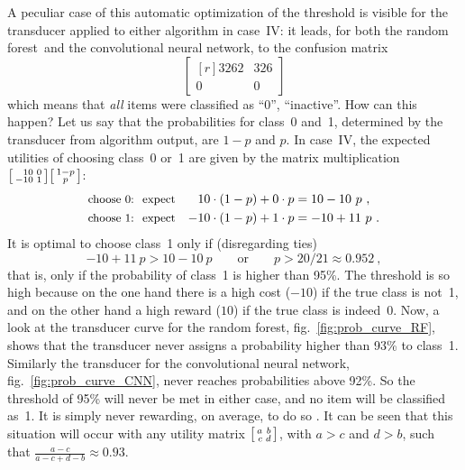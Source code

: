 \documentclass[a4paper,12pt,%
onecolumn,oneside,article,%
british%
]{memoir}
\newcommand*{\p}{\mathrm{p}}%
\renewcommand*{\|}[1][]{\nonscript\:#1\vert\nonscript\:\mathopen{}}
\newcommand*{\fig}{fig.}%
\newcommand*{\cf}{{cf.}}
\newcommand*{\texts}[1]{\text{\small #1}}
\newcommand*{\RF}{random forest}
\newcommand*{\CNN}{convolutional neural network}
\newcommand*{\umatrix}[4]{\begin{bmatrix*}[r]#1&#2\\#3&#4\end{bmatrix*}}
\newcommand*{\sumatrix}[4]{\begin{bsmallmatrix*}[r]#1&#2\\#3&#4\end{bsmallmatrix*}}
\begin{document}
A peculiar case of this automatic optimization of the threshold is visible for the transducer applied to either algorithm in case~IV: it leads, for both the \RF\ and the \CNN, to the confusion matrix
\begin{equation}
  \label{eq:peculiar_CM}
  \umatrix{3262}{326}{0}{0}
\end{equation}
which means that \emph{all} items were classified as \enquote{0}, \enquote{inactive}. How can this happen? Let us say that the probabilities for class~0 and~1, determined by the transducer from algorithm output, are $1-p$ and $p$. In case~IV, the expected utilities of choosing class~0 or~1 are given by the matrix multiplication $\sumatrix{10}{0}{-10}{1} \begin{bsmallmatrix}1-p\\p\end{bsmallmatrix}$:
\begin{equation}
  \label{eq:expe_utilities_peculiar}
  \begin{aligned}
    \texts{choose 0:\; expect}&& 10 \cdot (1-p) + 0 \cdot p &= 10 - 10\ p \ ,
                                                            \\
    \texts{choose 1:\; expect}&& -10 \cdot (1-p) + 1 \cdot p &= -10 + 11\ p \ .
  \end{aligned}
\end{equation}
It is optimal to choose class~1 only if (disregarding ties)
\begin{equation}
  \label{eq:when_choose_0}
  -10 + 11\ p > 10 - 10\ p
  \qquad\text{or}\qquad
  p > 20/21 \approx 0.952 \ ,
\end{equation}
that is, only if the probability of class~1 is higher than 95\%. The threshold is so high because on the one hand there is a high cost ($-10$) if the true class is not~1, and on the other hand a high reward ($10$) if the true class is indeed~0. Now, a look at the transducer curve for the \RF, \fig~\ref{fig:prob_curve_RF}, shows that the transducer never assigns a probability higher than 93\% to class~1. Similarly the transducer for the \CNN, \fig~\ref{fig:prob_curve_CNN}, never reaches probabilities above 92\%. So the threshold of 95\% will never be met in either case, and no item will be classified as~1. It is simply never rewarding, on average, to do so \autocites[\cf\ the analysis by]{drummondetal2005}. It can be seen that this situation will occur with any utility matrix $\sumatrix{a}{b}{c}{d}$, with $a>c$ and $d>b$, such that $\frac{a-c}{a-c+d-b}\approx 0.93$.
\end{document}
